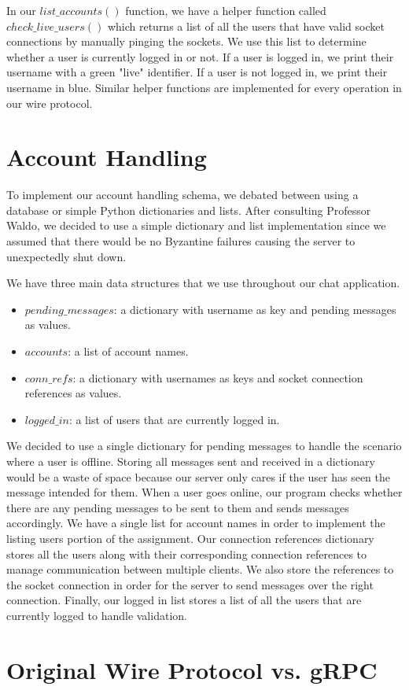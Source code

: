\documentclass[
	a4paper, %
	10pt, %
	unnumberedsections, %
	twoside, %
]{LTJournalArticle}
\begin{document}
In our $list\_accounts()$ function, we have a helper function called $check\_live\_users()$ which returns a list of all the users that have valid socket connections by manually pinging the sockets. We use this list to determine whether a user is currently logged in or not. If a user is logged in, we print their username with a green "live" identifier. If a user is not logged in, we print their username in blue. Similar helper functions are implemented for every operation in our wire protocol.

\section{Account Handling}

To implement our account handling schema, we debated between using a database or simple Python dictionaries and lists. After consulting Professor Waldo, we decided to use a simple dictionary and list implementation since we assumed that there would be no Byzantine failures causing the server to unexpectedly shut down. 

We have three main data structures that we use throughout our chat application. 
\begin{itemize}
    \item $pending\_messages$: a dictionary with username as key and pending messages as values. 
    \item $accounts$: a list of account names. 
    \item $conn\_refs$: a dictionary with usernames as keys and socket connection references as values.
    \item $logged\_in$: a list of users that are currently logged in. 
\end{itemize}

We decided to use a single dictionary for pending messages to handle the scenario where a user is offline. Storing all messages sent and received in a dictionary would be a waste of space because our server only cares if the user has seen the message intended for them. When a user goes online, our program checks whether there are any pending messages to be sent to them and sends messages accordingly. We have a single list for account names in order to implement the listing users portion of the assignment. Our connection references dictionary stores all the users along with their corresponding connection references to manage communication between multiple clients. We also store the references to the socket connection in order for the server to send messages over the right connection. Finally, our logged in list stores a list of all the users that are currently logged to handle validation. 

\section{Original Wire Protocol vs. gRPC}
\end{document}
